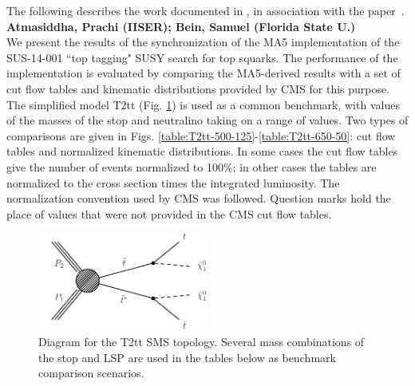 \FloatBarrier


The following describes the work documented in \cite{MA5-CMS-SUS-14-001}, in association with the paper~\cite{MA5-CMS-SUS-14-001}.
\textbf{Atmasiddha, Prachi (IISER); Bein, Samuel (Florida State U.)}\\
We present the results of the synchronization of the MA5
implementation of the SUS-14-001 ``top tagging" SUSY search for top squarks.  The
performance of the implementation is evaluated by comparing the
MA5-derived results with a set of cut flow tables and kinematic
distributions provided by CMS for this purpose. The simplified model
T2tt (Fig. \ref{fig:T2tt}) is used as a common benchmark, with values of the masses of the
stop and neutralino taking on a range of values. Two types of
comparisons are given in 
Figs. \ref{table:T2tt-500-125}-\ref{table:T2tt-650-50}: cut flow tables and normalized
kinematic distributions. In some cases the
cut flow tables give the number of events normalized to 100\%; in
other cases the tables are normalized to the cross section times the
integrated luminosity. The normalization convention used by CMS was
followed. Question marks hold the place of values that were not
provided in the CMS cut flow tables.
   \begin{figure}
  \centering
    \includegraphics[width=0.5\textwidth]{figures/Appendices/Ma5ValidationSUS13012/T2tt.pdf}
      \caption{Diagram for the T2tt SMS topology. Several mass
        combinations of the stop and LSP are used in the tables below
        as benchmark comparison scenarios.}
      \label{fig:T2tt}
\end{figure}

